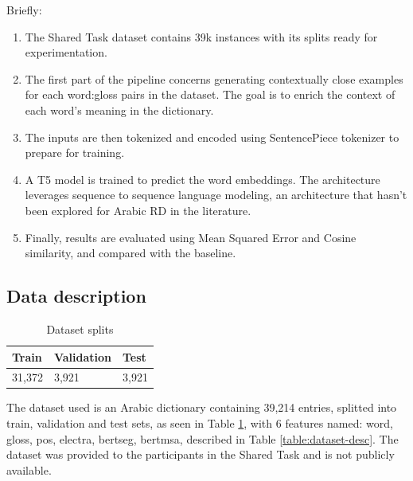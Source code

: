 \documentclass[15pt]{article}
\begin{document}
Briefly:
\begin{enumerate}
    \item The Shared Task dataset contains 39k instances with its splits ready for experimentation.
    \item The first part of the pipeline concerns generating contextually close examples for each word:gloss pairs in the dataset. The goal is to enrich the context of each word's meaning in the dictionary.
    \item The inputs are then tokenized and encoded using SentencePiece tokenizer to prepare for training.
    \item A T5 model is trained to predict the word embeddings. The architecture leverages sequence to sequence language modeling, an architecture that hasn’t been explored for Arabic RD in the literature.
    \item Finally, results are evaluated using Mean Squared Error and Cosine similarity, and compared with the baseline.
\end{enumerate}

\subsection{Data description}

\begin{table}[H]
    \centering
    \caption{Dataset splits}
    \label{table:dataset-splits}
    \renewcommand{\arraystretch}{1.5}%
    \begin{tabularx}{\textwidth}{|X|X|X|}
        \hline
        \textbf{Train} & \textbf{Validation} & \textbf{Test} \\
        \hline
        31,372 & 3,921 & 3,921 \\
        \hline
    \end{tabularx}
\end{table}

The dataset used is an Arabic dictionary containing 39,214 entries, splitted into train, validation and test sets, as seen in Table \ref{table:dataset-splits}, with 6 features named: word, gloss, pos, electra, bertseg, bertmsa, described in Table \ref{table:dataset-desc}. The dataset was provided to the participants in the Shared Task and is not publicly available.
\end{document}
